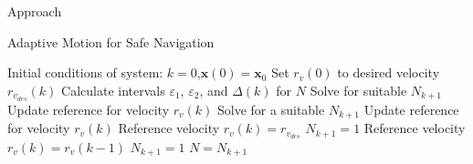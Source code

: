 \begin{section}{Approach}
\begin{algorithm}
   \caption{Adaptive Motion for Safe Navigation} 
   \label{alg:adapt_motion} 
    \begin{algorithmic}[1]
	\State Initial conditions of system: $k=0$,$\bm{x}(0)=\bm{x}_0$
	\State Set $r_v(0)$ to desired velocity $r_{v_{des}}(k)$
        \State {}
        \State Calculate intervals $\varepsilon_1$, $\varepsilon_2$, and $\Delta(k)$ for $N$
            \State Solve for suitable $N_{k+1}$
            \State Update reference for velocity $r_v(k)$
        \Else
                \State Solve for a suitable $N_{k+1}$
                \State Update reference for velocity $r_v(k)$
            \Else
                    \State Reference velocity $r_v(k)=r_{v_{des}}$
                    \State $N_{k+1} = 1$
                \Else
                    \State Reference velocity $r_v(k) = r_v(k-1)$
                    \State $N_{k+1} = 1$
                \EndIf
            \EndIf
        \EndIf
        \State $N = N_{k+1}$
    \EndWhile
	\end{algorithmic}
\end{algorithm}



\end{section} 
